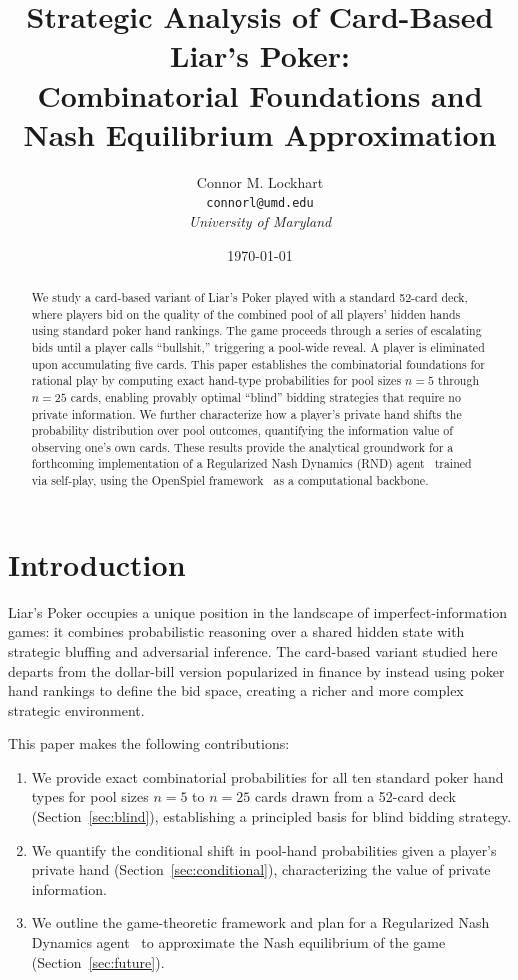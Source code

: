 \documentclass[11pt, a4paper]{article}
\title{Strategic Analysis of Card-Based Liar's Poker:\\
       Combinatorial Foundations and Nash Equilibrium Approximation}
\author{Connor M. Lockhart \\ \texttt{connorl@umd.edu} \\ \textit{University of Maryland}}
\date{\today}
\theoremstyle{definition}
\begin{document}
\maketitle

\begin{abstract}
We study a card-based variant of Liar's Poker played with a standard 52-card deck, where
players bid on the quality of the combined pool of all players' hidden hands using standard
poker hand rankings. The game proceeds through a series of escalating bids until a player
calls ``bullshit,'' triggering a pool-wide reveal. A player is eliminated upon accumulating
five cards. This paper establishes the combinatorial foundations for rational play by
computing exact hand-type probabilities for pool sizes $n = 5$ through $n = 25$ cards,
enabling provably optimal ``blind'' bidding strategies that require no private information.
We further characterize how a player's private hand shifts the probability distribution
over pool outcomes, quantifying the information value of observing one's own cards. These
results provide the analytical groundwork for a forthcoming implementation of a
Regularized Nash Dynamics (RND) agent~\cite{rnd_paper} trained via self-play, using the
OpenSpiel framework~\cite{openspiel} as a computational backbone.
\end{abstract}

\section{Introduction}

Liar's Poker occupies a unique position in the landscape of imperfect-information games:
it combines probabilistic reasoning over a shared hidden state with strategic bluffing and
adversarial inference. The card-based variant studied here departs from the
dollar-bill version popularized in finance by instead using poker hand rankings to define
the bid space, creating a richer and more complex strategic environment.


This paper makes the following contributions:
\begin{enumerate}
    \item We provide exact combinatorial probabilities for all ten standard poker hand
          types for pool sizes $n = 5$ to $n = 25$ cards drawn from a 52-card deck
          (Section~\ref{sec:blind}), establishing a principled basis for blind bidding
          strategy.
    \item We quantify the conditional shift in pool-hand probabilities given a player's
          private hand (Section~\ref{sec:conditional}), characterizing the value of
          private information.
    \item We outline the game-theoretic framework and plan for a Regularized Nash
          Dynamics agent~\cite{rnd_paper} to approximate the Nash equilibrium of the game
          (Section~\ref{sec:future}).
\end{enumerate}
\end{document}
